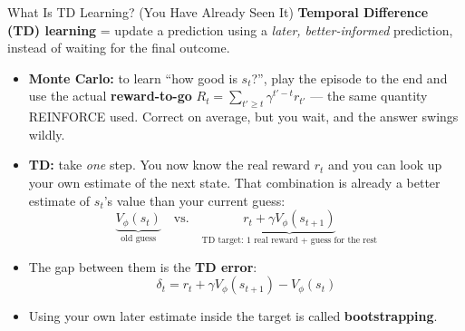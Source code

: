 \begin{frame}{What Is TD Learning? (You Have Already Seen It)}
\textbf{Temporal Difference (TD) learning} = update a prediction using a \emph{later, better-informed} prediction, instead of waiting for the final outcome.
\vspace{0.4em}
\begin{itemize}
    \item \textbf{Monte Carlo:} to learn ``how good is $s_t$?'', play the episode to the end and use the actual \textbf{reward-to-go} $R_t = \sum_{t' \geq t} \gamma^{t'-t} r_{t'}$ --- the same quantity REINFORCE used. Correct on average, but you wait, and the answer swings wildly.
    \item \textbf{TD:} take \emph{one} step. You now know the real reward $r_t$ and you can look up your own estimate of the next state. That combination is already a better estimate of $s_t$'s value than your current guess:
    $$\underbrace{V_\phi(s_t)}_{\text{old guess}} \quad\text{vs.}\quad \underbrace{r_t + \gamma V_\phi(s_{t+1})}_{\text{TD target: 1 real reward + guess for the rest}}$$
    \item The gap between them is the \textbf{TD error}:
    $$\delta_t = r_t + \gamma V_\phi(s_{t+1}) - V_\phi(s_t)$$
    \item Using your own later estimate inside the target is called \textbf{bootstrapping}.
\end{itemize}
\end{frame}

